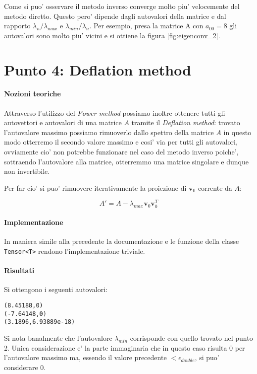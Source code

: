 Come si puo' osservare il metodo inverso converge molto piu' velocemente del
metodo diretto. Questo pero' dipende dagli autovalori della matrice e dal
rapporto $\lambda_n/\lambda_{max}$ e $\lambda_{min}/\lambda_n$. Per esempio,
presa la matrice A con $a_{00} = 8$ gli autovalori sono molto piu' vicini e si
ottiene la figura \ref{fig:eigenconv_2}.

\section{Punto 4: Deflation method}

\paragraph{Nozioni teoriche}

Attraverso l'utilizzo del \textit{Power method} possiamo inoltre ottenere tutti gli autovettori e autovalori di una matrice $A$ tramite il \textit{Deflation method}: trovato l'autovalore massimo possiamo rimuoverlo dallo spettro della matrice $A$ in questo modo otterremo il secondo valore massimo e cosi' via per tutti gli autovalori, ovviamente cio' non potrebbe funzionare nel caso del metodo inverso poiche', sottraendo l'autovalore alla matrice, otterremmo una matrice singolare e dunque non invertibile.

Per far cio' si puo' rimuovere iterativamente la proiezione di $\mathbf{v}_{0}$ corrente da $A$:

\[ A' = A - \lambda_{max} \mathbf{v}_{0} \mathbf{v}_{0}^T \]


\paragraph{Implementazione} In maniera simile alla precedente la documentazione e le funzione della classe \texttt{Tensor<T>} rendono l'implementazione triviale.

\paragraph{Risultati} Si ottengono i seguenti autovalori:

\begin{lstlisting}
(8.45188,0)
(-7.64148,0)
(3.1896,6.93889e-18)
\end{lstlisting}

Si nota banalmente che l'autovalore $\lambda_{min}$ corrisponde con quello trovato nel punto 2. Unica considerazione e' la parte immaginaria che in questo caso risulta 0 per l'autovalore massimo ma, essendo il valore precedente $< \epsilon_{double}$, si puo' considerare 0.




